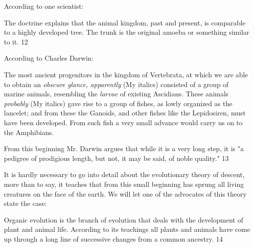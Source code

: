 According to one scientist:

The doctrine explains that the animal kingdom, past and present, is comparable to a highly
developed tree. The trunk is the original amoeba or something similar to it. 12

According to Charles Darwin:

The most ancient progenitors in the kingdom of Vertebrata, at which we are able to obtain an
\textit{obscure glance, apparently} (My italics) consisted of a group of marine animals, resembling
the \textit{larvae} of existing Ascidians. These animals \textit{probably} (My italics) gave rise to a group of
fishes, as lowly organized as the lancelet; and from these the Ganoids, and other fishes like
the Lepidosiren, must have been developed. From such fish a very small advance would
carry us on to the Amphibians.

From this beginning Mr. Darwin argues that while it is a very long step, it is "a pedigree of
prodigious length, but not, it may be said, of noble quality." 13

It is hardly necessary to go into detail about the evolutionary theory of descent, more than to
say, it teaches that from this small beginning has sprung all living creatures on the face of the
earth. We will let one of the advocates of this theory state the case:

Organic evolution is the branch of evolution that deals with the development of plant and
animal life. According to its teachings all plants and animals have come up through a long
line of successive changes from a common ancestry. 14

